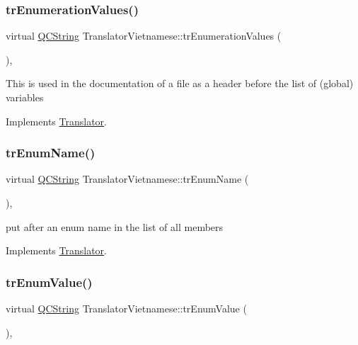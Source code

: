 \subsubsection{\texorpdfstring{trEnumerationValues()}{trEnumerationValues()}}
{\footnotesize\ttfamily virtual \mbox{\hyperlink{class_q_c_string}{Q\+C\+String}} Translator\+Vietnamese\+::tr\+Enumeration\+Values (\begin{DoxyParamCaption}{ }\end{DoxyParamCaption})\hspace{0.3cm}{\ttfamily [inline]}, {\ttfamily [virtual]}}

This is used in the documentation of a file as a header before the list of (global) variables 

Implements \mbox{\hyperlink{class_translator}{Translator}}.

\mbox{\label{class_translator_vietnamese_a526b3dd360fb83732c9f697ca7e2fd6c}} 
\subsubsection{\texorpdfstring{trEnumName()}{trEnumName()}}
{\footnotesize\ttfamily virtual \mbox{\hyperlink{class_q_c_string}{Q\+C\+String}} Translator\+Vietnamese\+::tr\+Enum\+Name (\begin{DoxyParamCaption}{ }\end{DoxyParamCaption})\hspace{0.3cm}{\ttfamily [inline]}, {\ttfamily [virtual]}}

put after an enum name in the list of all members 

Implements \mbox{\hyperlink{class_translator}{Translator}}.

\mbox{\label{class_translator_vietnamese_aebde5a5e7e5a8e2bdcedd16aa84b104b}} 
\subsubsection{\texorpdfstring{trEnumValue()}{trEnumValue()}}
{\footnotesize\ttfamily virtual \mbox{\hyperlink{class_q_c_string}{Q\+C\+String}} Translator\+Vietnamese\+::tr\+Enum\+Value (\begin{DoxyParamCaption}{ }\end{DoxyParamCaption})\hspace{0.3cm}{\ttfamily [inline]}, {\ttfamily [virtual]}}

